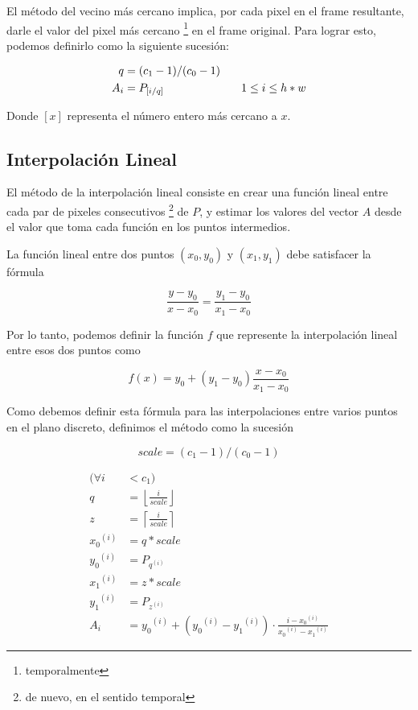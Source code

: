 El m\'etodo del vecino m\'as cercano implica, por cada pixel en el frame
resultante, darle el valor del pixel m\'as cercano \footnote{temporalmente} en
el frame original. Para lograr esto, podemos definirlo como la siguiente
sucesi\'on:

\[
\begin{split}
q & = (c_1 - 1) / (c_0 - 1) \\
A_i & = P_{\left[i / q \right]} \hspace{.2\textwidth} 1 \leq i \leq h*w
\end{split}
\]

Donde $\left[x\right]$ representa el n\'umero entero m\'as cercano a $x$.

\subsection{Interpolaci\'on Lineal}

El m\'etodo de la interpolaci\'on lineal consiste en crear una funci\'on lineal
entre cada par de pixeles consecutivos \footnote{de nuevo, en el sentido
temporal} de $P$, y estimar los valores del vector $A$ desde el valor que toma
cada funci\'on en los puntos intermedios.

La funci\'on lineal entre dos puntos $\left(x_0, y_0\right)$ y $\left(x_1,
y_1\right)$ debe satisfacer la f\'ormula

\[
\frac{y - y_0}{x - x_0} = \frac{y_1 - y_0}{x_1 - x_0}
\]

Por lo tanto, podemos definir la funci\'on $f$ que represente la interpolaci\'on
lineal entre esos dos puntos como

\[
f(x) = y_0 + (y_1 - y_0) \frac{x - x_0}{x_1 - x_0}
\]

Como debemos definir esta f\'ormula para las interpolaciones entre varios puntos en
el plano discreto, definimos el m\'etodo como la sucesi\'on

\[
scale = (c_1 - 1) / (c_0 - 1)
\]

\[
\begin{split}
(\forall i & < c_1) \\
q & = \left\lfloor \frac{i}{scale} \right\rfloor \\ 
z & = \left\lceil \frac{i}{scale} \right\rceil \\
{x_0}^{(i)} & = q * scale \\
{y_0}^{(i)} & = P_{{q}^{(i)}} \\
{x_1}^{(i)} & = z * scale \\
{y_1}^{(i)} & = P_{{z}^{(i)}} \\
A_i & = {y_0}^{(i)} + ({y_0}^{(i)} - {y_1}^{(i)}) \cdot \frac{i - {x_0}^{(i)}}{{x_0}^{(i)} - {x_1}^{(i)}}
\end{split}
\]

